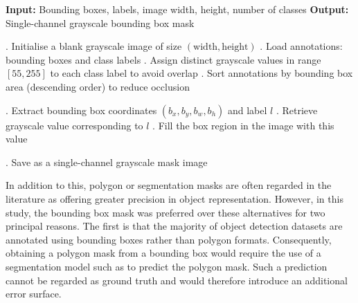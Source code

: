         
\begin{algorithm}
    \caption{Generating Bounding Box Mask (Privileged Information) for Object Detection}
    \label{alg:boundingBoxMask}
    \begin{algorithmic}
        \State \textbf{Input:} Bounding boxes, labels, image width, height, number of classes
        \State \textbf{Output:} Single-channel grayscale bounding box mask
        
        . Initialise a blank grayscale image of size \( (\text{width}, \text{height}) \)
        . Load annotations: bounding boxes and class labels
        . Assign distinct grayscale values in range $[55, 255]$ to each class label to avoid overlap
        . Sort annotations by bounding box area (descending order) to reduce occlusion
        
            . Extract bounding box coordinates \( (b_x, b_y, b_w, b_h) \) and label \( l \)
            . Retrieve grayscale value corresponding to \( l \)
            . Fill the box region in the image with this value
        \EndFor
        
        . Save as a single-channel grayscale mask image
    \end{algorithmic}
\end{algorithm}

In addition to this, polygon or segmentation masks are often regarded in the literature \cite{mask_to_annotation, lupi_od_extra1, lupi_od_extra2} as offering greater precision in object representation. However, in this study, the bounding box mask was preferred over these alternatives for two principal reasons. The first is that the majority of object detection datasets are annotated using bounding boxes rather than polygon formats. Consequently, obtaining a polygon mask from a bounding box would require the use of a segmentation model such as \cite{maskrcnn, deeplabv3, sam, sam2} to predict the polygon mask. Such a prediction cannot be regarded as ground truth and would therefore introduce an additional error surface.

